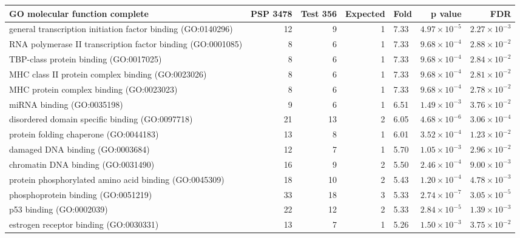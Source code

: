\begin{table}[ht]
\centering
\begin{adjustbox}{width=\textwidth}
\begin{tabular}{lrrrlrr}
  \hline
GO molecular function complete & PSP 3478 & Test 356 & Expected & Fold & p value & FDR \\ 
  \hline
general transcription initiation factor binding (GO:0140296) & 12 & 9 & 1 & 7.33 & $4.97 \times 10^{-5}$ & $2.27 \times 10^{-3}$ \\ 
  RNA polymerase II transcription factor binding (GO:0001085) & 8 & 6 & 1 & 7.33 & $9.68 \times 10^{-4}$ & $2.88 \times 10^{-2}$ \\ 
  TBP-class protein binding (GO:0017025) & 8 & 6 & 1 & 7.33 & $9.68 \times 10^{-4}$ & $2.84 \times 10^{-2}$ \\ 
  MHC class II protein complex binding (GO:0023026) & 8 & 6 & 1 & 7.33 & $9.68 \times 10^{-4}$ & $2.81 \times 10^{-2}$ \\ 
  MHC protein complex binding (GO:0023023) & 8 & 6 & 1 & 7.33 & $9.68 \times 10^{-4}$ & $2.78 \times 10^{-2}$ \\ 
  miRNA binding (GO:0035198) & 9 & 6 & 1 & 6.51 & $1.49 \times 10^{-3}$ & $3.76 \times 10^{-2}$ \\ 
  disordered domain specific binding (GO:0097718) & 21 & 13 & 2 & 6.05 & $4.68 \times 10^{-6}$ & $3.06 \times 10^{-4}$ \\ 
  protein folding chaperone (GO:0044183) & 13 & 8 & 1 & 6.01 & $3.52 \times 10^{-4}$ & $1.23 \times 10^{-2}$ \\ 
  damaged DNA binding (GO:0003684) & 12 & 7 & 1 & 5.70 & $1.05 \times 10^{-3}$ & $2.96 \times 10^{-2}$ \\ 
  chromatin DNA binding (GO:0031490) & 16 & 9 & 2 & 5.50 & $2.46 \times 10^{-4}$ & $9.00 \times 10^{-3}$ \\ 
  protein phosphorylated amino acid binding (GO:0045309) & 18 & 10 & 2 & 5.43 & $1.20 \times 10^{-4}$ & $4.78 \times 10^{-3}$ \\ 
  phosphoprotein binding (GO:0051219) & 33 & 18 & 3 & 5.33 & $2.74 \times 10^{-7}$ & $3.05 \times 10^{-5}$ \\ 
  p53 binding (GO:0002039) & 22 & 12 & 2 & 5.33 & $2.84 \times 10^{-5}$ & $1.39 \times 10^{-3}$ \\ 
  estrogen receptor binding (GO:0030331) & 13 & 7 & 1 & 5.26 & $1.50 \times 10^{-3}$ & $3.75 \times 10^{-2}$ \\ 

\end{tabular}
\end{adjustbox}
\end{table}
